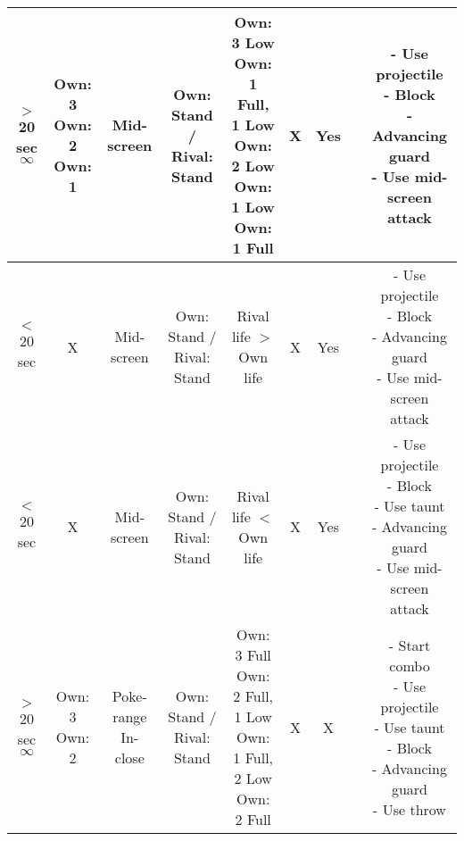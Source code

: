 \documentclass{article}
\begin{document}
\begin{landscape}
\begin{table}[h!]
\begin{center}
\begin{tabular*}{24cm}{c|c|c|c|c|c|c|c|c}
     \hline
     \makecell{$>$ 20 sec \\ $\infty$} & \makecell{Own: 3 \\ Own: 2 \\ Own: 1} & Mid-screen & Own: Stand / Rival: Stand & \makecell{Own: 3 Low \\ Own: 1 Full, 1 Low \\ Own: 2 Low \\ Own: 1 Low \\ Own: 1 Full} & X & Yes & & \makecell{- Use projectile \\ - Block \\ - Advancing guard \\ - Use mid-screen attack}\\
     \hline
     $<$ 20 sec & X & Mid-screen & Own: Stand / Rival: Stand & Rival life $>$ Own life & X & Yes & & \makecell{- Use projectile \\ - Block \\ - Advancing guard \\ - Use mid-screen attack}\\
     \hline
     $<$ 20 sec & X & Mid-screen & Own: Stand / Rival: Stand & Rival life $<$ Own life & X & Yes & & \makecell{- Use projectile \\ - Block \\ - Use taunt \\ - Advancing guard \\ - Use mid-screen attack}\\
     \hline
     \makecell{$>$ 20 sec \\ $\infty$} & \makecell{Own: 3 \\ Own: 2} & \makecell{Poke-range \\ In-close} & Own: Stand / Rival: Stand & \makecell {Own: 3 Full \\ Own: 2 Full, 1 Low \\ Own: 1 Full, 2 Low \\ Own: 2 Full} & X & X & & \makecell{- Start combo \\ - Use projectile \\ - Use taunt \\ - Block \\ - Advancing guard \\ - Use throw}\\
     \hline
 \end{tabular*}
  \end{center}
\end{table}

\end{landscape}
\end{document}
